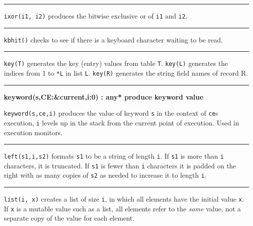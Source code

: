 \bigskip\hrule\vspace{0.1cm}

\noindent
\texttt{ixor(i1, i2)} produces the bitwise exclusive
or of \texttt{i1} and \texttt{i2}.

\bigskip\hrule\vspace{0.1cm}

\noindent
{}\texttt{kbhit()} checks to see if there is a
keyboard character waiting to be read.

\bigskip\hrule\vspace{0.1cm}

\noindent
{}\texttt{key(T)} generates the key (entry) values from
table \texttt{T}. \texttt{key(L)} generates the indices from 1 to
\texttt{*L} in list \texttt{L}. \texttt{key(R)} generates the string
field names of record R.

\bigskip\hrule\vspace{0.1cm}
\noindent
{\bf keyword(s,CE:\&current,i:0) : any* \hfill produce keyword value}

\noindent
{}\texttt{keyword(s,ce,i)} produces the value of keyword
\texttt{s} in the context of \texttt{ce}{\textquotesingle}s execution,
\texttt{i} levels up in the stack from the current point of execution.
Used in execution monitors.

\bigskip\hrule\vspace{0.1cm}

\noindent
{}\texttt{left(s1,i,s2)} formats \texttt{s1} to be a string
of length \texttt{i}. If \texttt{s1} is more than \texttt{i}
characters, it is truncated. If \texttt{s1} is fewer than \texttt{i}
characters it is padded on the right with as many copies of \texttt{s2}
as needed to increase it to length \texttt{i}.

\bigskip\hrule\vspace{0.1cm}

\noindent
{}\texttt{list(i, x)} creates a list of size \texttt{i},
in which all elements have the initial value \texttt{x}. If \texttt{x}
is a mutable value such as a list, all elements refer to the
\textit{same} value, not a separate copy of the value for each element.

